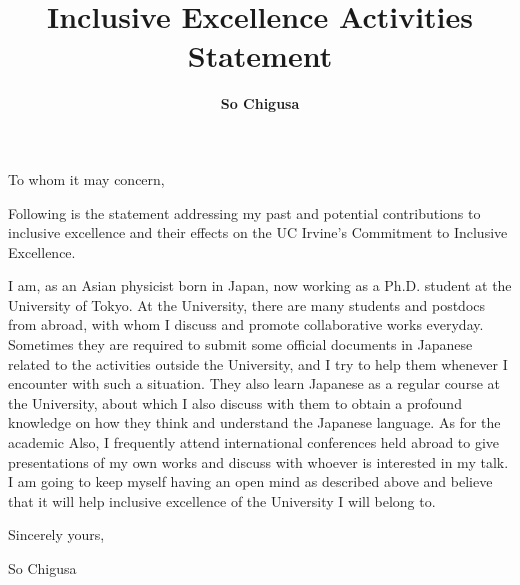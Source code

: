 \documentclass[12pt,notitlepage]{article}
\title{\vspace*{-3cm}Inclusive Excellence Activities Statement}
\author{\textbf{So Chigusa}}
\date{}
\begin{document}
\maketitle
\thispagestyle{empty}

To whom it may concern,

\vspace{5mm}
Following is the statement addressing my past and potential contributions to inclusive excellence and their effects on the UC Irvine's Commitment to Inclusive Excellence.

I am, as an Asian physicist born in Japan, now working as a Ph.D. student at the University of Tokyo.
At the University, there are many students and postdocs from abroad, with whom I discuss and promote collaborative works everyday.
Sometimes they are required to submit some official documents in Japanese related to the activities outside the University, and I try to help them whenever I encounter with such a situation.
They also learn Japanese as a regular course at the University, about which I also discuss with them to obtain a profound knowledge on how they think and understand the Japanese language.
As for the academic 
Also, I frequently attend international conferences held abroad to give presentations of my own works and discuss with whoever is interested in my talk.
I am going to keep myself having an open mind as described above and believe that it will help inclusive excellence of the University I will belong to.


\vspace{5mm}
Sincerely yours,

\vspace{5mm}
So Chigusa
\end{document}
